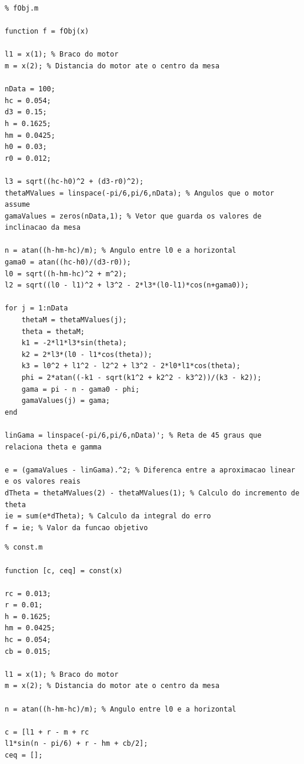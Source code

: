 \documentclass[12pt]{article}
\begin{document}
\begin{lstlisting}
% fObj.m

function f = fObj(x)

l1 = x(1); % Braco do motor
m = x(2); % Distancia do motor ate o centro da mesa

nData = 100;
hc = 0.054;
d3 = 0.15;
h = 0.1625;
hm = 0.0425;
h0 = 0.03;
r0 = 0.012;

l3 = sqrt((hc-h0)^2 + (d3-r0)^2);
thetaMValues = linspace(-pi/6,pi/6,nData); % Angulos que o motor assume
gamaValues = zeros(nData,1); % Vetor que guarda os valores de inclinacao da mesa

n = atan((h-hm-hc)/m); % Angulo entre l0 e a horizontal
gama0 = atan((hc-h0)/(d3-r0));
l0 = sqrt((h-hm-hc)^2 + m^2);
l2 = sqrt((l0 - l1)^2 + l3^2 - 2*l3*(l0-l1)*cos(n+gama0));

for j = 1:nData
	thetaM = thetaMValues(j);
	theta = thetaM;
	k1 = -2*l1*l3*sin(theta);
	k2 = 2*l3*(l0 - l1*cos(theta));
	k3 = l0^2 + l1^2 - l2^2 + l3^2 - 2*l0*l1*cos(theta);
	phi = 2*atan((-k1 - sqrt(k1^2 + k2^2 - k3^2))/(k3 - k2));
	gama = pi - n - gama0 - phi;
	gamaValues(j) = gama;
end

linGama = linspace(-pi/6,pi/6,nData)'; % Reta de 45 graus que relaciona theta e gamma

e = (gamaValues - linGama).^2; % Diferenca entre a aproximacao linear e os valores reais
dTheta = thetaMValues(2) - thetaMValues(1); % Calculo do incremento de theta
ie = sum(e*dTheta); % Calculo da integral do erro
f = ie; % Valor da funcao objetivo
\end{lstlisting}

\begin{lstlisting}
% const.m

function [c, ceq] = const(x)

rc = 0.013;
r = 0.01;
h = 0.1625;
hm = 0.0425;
hc = 0.054;
cb = 0.015;

l1 = x(1); % Braco do motor
m = x(2); % Distancia do motor ate o centro da mesa

n = atan((h-hm-hc)/m); % Angulo entre l0 e a horizontal

c = [l1 + r - m + rc
l1*sin(n - pi/6) + r - hm + cb/2];
ceq = [];
\end{lstlisting}
\end{document}
